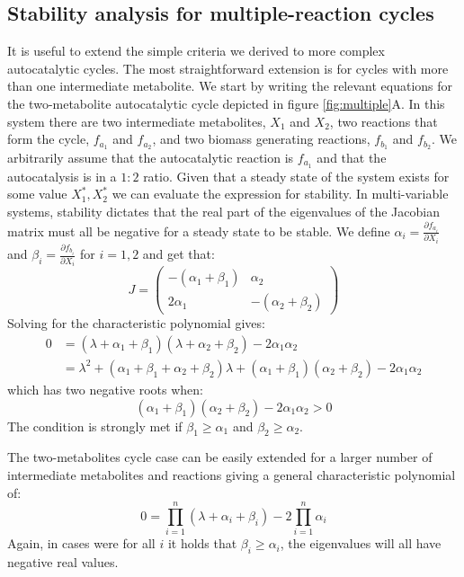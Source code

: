 \documentclass[a4page,notitlepage]{article}
\begin{document}
    \subsection{Stability analysis for multiple-reaction cycles}
    It is useful to extend the simple criteria we derived to more complex autocatalytic cycles.
    The most straightforward extension is for cycles with more than one intermediate metabolite.
    We start by writing the relevant equations for the two-metabolite autocatalytic cycle depicted in figure \ref{fig:multiple}A.
    In this system there are two intermediate metabolites, $X_1$ and $X_2$, two reactions that form the cycle, $f_{a_1}$ and $f_{a_2}$, and two biomass generating reactions, $f_{b_1}$ and $f_{b_2}$.
    We arbitrarily assume that the autocatalytic reaction is $f_{a_1}$ and that the autocatalysis is in a $1:2$ ratio.
    Given that a steady state of the system exists for some value $X_1^*,X_2^*$ we can evaluate the expression for stability.
    In multi-variable systems, stability dictates that the real part of the eigenvalues of the Jacobian matrix must all be negative for a steady state to be stable.
    We define $\alpha_i=\frac{\partial f_{a_i}}{\partial X_i}$ and $\beta_i=\frac{\partial f_{b_i}}{\partial X_i}$ for $i=1,2$ and get that:
    \begin{equation*}
        J=
        \begin{pmatrix}
            -(\alpha_1+\beta_1) & \alpha_2 \\
            2\alpha_1 & -(\alpha_2+\beta_2)
        \end{pmatrix}
    \end{equation*}
    Solving for the characteristic polynomial gives:
    \begin{align}
        0 & =(\lambda+\alpha_1+\beta_1)(\lambda+\alpha_2+\beta_2)-2\alpha_1\alpha_2 \\
        & = \lambda^2+(\alpha_1+\beta_1+\alpha_2+\beta_2)\lambda+(\alpha_1+\beta_1)(\alpha_2+\beta_2)-2\alpha_1\alpha_2
    \end{align}
    which has two negative roots when:
    \begin{equation}
        (\alpha_1+\beta_1)(\alpha_2+\beta_2)-2\alpha_1\alpha_2>0
    \end{equation}
    The condition is strongly met if $\beta_1\geq \alpha_1$ and $\beta_2\geq\alpha_2$.
    
    The two-metabolites cycle case can be easily extended for a larger number of intermediate metabolites and reactions giving a general characteristic polynomial of:
    \begin{equation}
        0=\prod_{i=1}^n(\lambda+\alpha_i+\beta_i)-2\prod_{i=1}^n\alpha_i
    \end{equation}
    Again, in cases were for all $i$ it holds that $\beta_i\geq\alpha_i$, the eigenvalues will all have negative real values.
    
\end{document}
